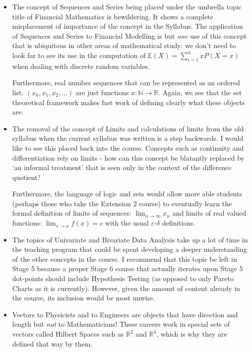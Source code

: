 \documentclass[11pt, a4paper, oneside]{article}
\begin{document}
\begin{itemize}
  \item The concept of Sequences and Series being placed under the umbrella topic title of Financial Mathematics is bewildering. It shows a complete misplacement of importance of the concept in the Syllabus. The application of Sequences and Series to Financial Modelling is but \emph{one} use of this concept that is ubiquitous in other areas of mathematical study: we don't need to look far to see its use in the computation of $\mathbb{E}(X) = \sum_{i=1}^n xP(X=x)$ when dealing with discrete random variables.

    Furthermore, real number sequences that can be represented as an ordered list: $(x_0, x_1, x_2, \ldots)$ are just functions $x: \mathbb{N} \rightarrow \mathbb{R}$. Again, we see that the set theoretical framework makes fast work of defining clearly what these objects are.

  \item The removal of the concept of Limits and calculations of limits from the old syllabus when the current syllabus was written is a step backwards. I would like to see this placed back into the course. Concepts such as continuity and differentiation rely on limits - how can this concept be blatantly replaced by `an informal treatment' that is seen only in the context of the difference quotient?

    Furthermore, the language of logic and sets would allow more able students (perhaps those who take the Extension 2 course) to eventually learn the formal definition of limits of sequences: $\lim_{n\rightarrow \infty} x_n$ and limits of real valued functions: $\lim_{x \rightarrow a} f(x) = c$ with the usual $\varepsilon$-$\delta$ definitions.

  \item The topics of Univariate and Bivariate Data Analysis take up a lot of time in the teaching program that could be spent developing a deeper understanding of the other concepts in the course. I recommend that this topic be left in Stage 5 because a proper Stage 6 course that actually iterates upon Stage 5 dot-points should include Hypothesis Testing (as opposed to only Pareto Charts as it is currently). However, given the amount of content already in the course, its inclusion would be most unwise.

  \item Vectors to Physicists and to Engineers are objects that have direction and length but \emph{not} to Mathematicians! These careers work in special sets of vectors called Hilbert Spaces such as $\mathbb{R}^2$ and $\mathbb{R}^3$, which is why they are defined that way by them.


\end{itemize}
\end{document}
